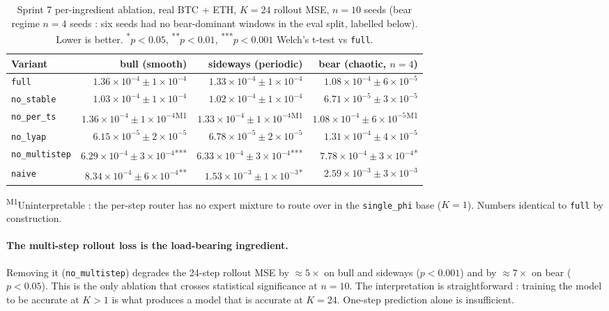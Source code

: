 \documentclass[11pt,a4paper]{article}
\begin{document}
\begin{table}[h]
\centering
\caption{Sprint 7 per-ingredient ablation, real BTC + ETH,
$K{=}24$ rollout MSE, $n{=}10$ seeds (bear regime $n{=}4$
seeds : six seeds had no bear-dominant windows in the eval split,
labelled below). Lower is better. \textsuperscript{*}$p{<}0.05$,
\textsuperscript{**}$p{<}0.01$, \textsuperscript{***}$p{<}0.001$
Welch's t-test vs \texttt{full}.}
\label{tab:sprint7}
\begin{tabular}{lrrr}
\toprule
Variant & bull (smooth) & sideways (periodic) & bear (chaotic, $n{=}4$) \\
\midrule
\texttt{full}         & $1.36{\times}10^{-4} {\pm} 1{\times}10^{-4}$ & $1.33{\times}10^{-4} {\pm} 1{\times}10^{-4}$ & $1.08{\times}10^{-4} {\pm} 6{\times}10^{-5}$ \\
\texttt{no\_stable}   & $1.03{\times}10^{-4} {\pm} 1{\times}10^{-4}$ & $1.02{\times}10^{-4} {\pm} 1{\times}10^{-4}$ & $6.71{\times}10^{-5} {\pm} 3{\times}10^{-5}$ \\
\texttt{no\_per\_ts}  & $1.36{\times}10^{-4} {\pm} 1{\times}10^{-4}$\textsuperscript{M1} & $1.33{\times}10^{-4} {\pm} 1{\times}10^{-4}$\textsuperscript{M1} & $1.08{\times}10^{-4} {\pm} 6{\times}10^{-5}$\textsuperscript{M1} \\
\texttt{no\_lyap}     & $6.15{\times}10^{-5} {\pm} 2{\times}10^{-5}$ & $6.78{\times}10^{-5} {\pm} 2{\times}10^{-5}$ & $1.31{\times}10^{-4} {\pm} 4{\times}10^{-5}$ \\
\texttt{no\_multistep}& $6.29{\times}10^{-4} {\pm} 3{\times}10^{-4}$\textsuperscript{***} & $6.33{\times}10^{-4} {\pm} 3{\times}10^{-4}$\textsuperscript{***} & $7.78{\times}10^{-4} {\pm} 3{\times}10^{-4}$\textsuperscript{*} \\
\texttt{naive}        & $8.34{\times}10^{-4} {\pm} 6{\times}10^{-4}$\textsuperscript{**}  & $1.53{\times}10^{-3} {\pm} 1{\times}10^{-3}$\textsuperscript{*}   & $2.59{\times}10^{-3} {\pm} 3{\times}10^{-3}$ \\
\bottomrule
\end{tabular}
\par\smallskip
\footnotesize\textsuperscript{M1}Uninterpretable : the per-step
router has no expert mixture to route over in the
\texttt{single\_phi} base ($K{=}1$). Numbers identical to
\texttt{full} by construction.
\end{table}

\paragraph{The multi-step rollout loss is the load-bearing
ingredient.} Removing it (\texttt{no\_multistep}) degrades the
24-step rollout MSE by $\approx 5\times$ on bull and sideways
($p{<}0.001$) and by $\approx 7\times$ on bear ($p{<}0.05$).
This is the only ablation that crosses statistical significance
at $n{=}10$. The interpretation is straightforward : training
the model to be accurate at $K{>}1$ is what produces a model
that is accurate at $K{=}24$. One-step prediction alone is
insufficient.
\end{document}
